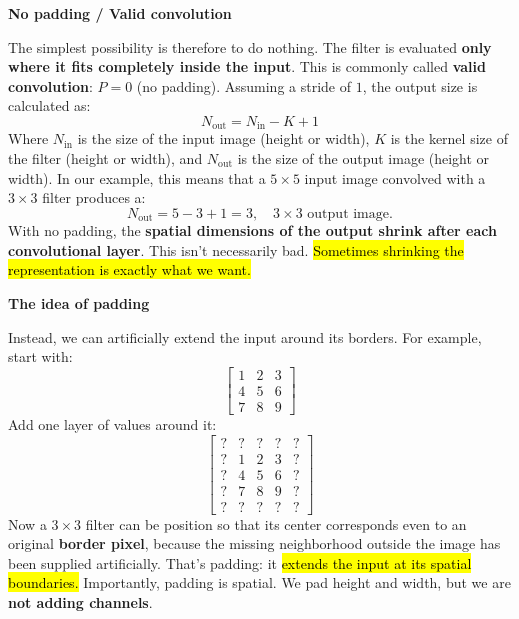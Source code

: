 \begin{flushleft}
    \textcolor{Green3}{ \textbf{No padding / Valid convolution}}\label{sec:no-padding-valid-convolution}
\end{flushleft}
The simplest possibility is therefore to do nothing. The filter is evaluated \textbf{only where it fits completely inside the input}. This is commonly called \textbf{valid convolution}: $P=0$ (no padding). Assuming a stride of $1$, the output size is calculated as:
\begin{equation*}
    N_{\text{out}} = N_{\text{in}} - K + 1
\end{equation*}
Where $N_{\text{in}}$ is the size of the input image (height or width), $K$ is the kernel size of the filter (height or width), and $N_{\text{out}}$ is the size of the output image (height or width). In our example, this means that a $5\times 5$ input image convolved with a $3\times 3$ filter produces a:
\begin{equation*}
    N_{\text{out}} = 5 - 3 + 1 = 3, \quad 3 \times 3 \text{ output image.}
\end{equation*}
With no padding, the \textbf{spatial dimensions of the output shrink after each convolutional layer}. This isn't necessarily bad. \hl{Sometimes shrinking the representation is exactly what we want.}

\highspace
\begin{flushleft}
    \textcolor{Green3}{ \textbf{The idea of padding}}
\end{flushleft}
Instead, we can artificially extend the input around its borders. For example, start with:
\begin{equation*}
    \begin{bmatrix}
        1 & 2 & 3 \\
        4 & 5 & 6 \\
        7 & 8 & 9
    \end{bmatrix}
\end{equation*}
Add one layer of values around it:
\begin{equation*}
    \begin{bmatrix}
        ? & ? & ? & ? & ? \\
        ? & 1 & 2 & 3 & ? \\
        ? & 4 & 5 & 6 & ? \\
        ? & 7 & 8 & 9 & ? \\
        ? & ? & ? & ? & ?
    \end{bmatrix}
\end{equation*}
Now a $3\times 3$ filter can be position so that its center corresponds even to an original \textbf{border pixel}, because the missing neighborhood outside the image has been supplied artificially. That's padding: it \hl{extends the input at its spatial boundaries.} Importantly, padding is spatial. We pad height and width, but we are \textbf{not adding channels}.


